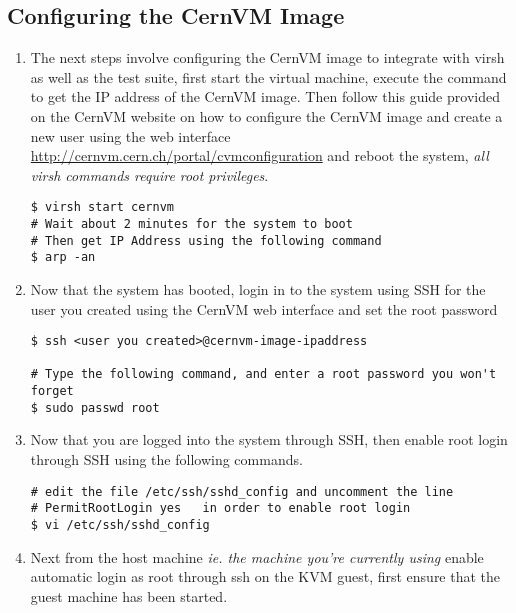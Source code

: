 \newpage
\subsection{Configuring the CernVM Image}
\label{sec:cernvmconfig}
\begin{enumerate}
\item 	The next steps involve configuring the CernVM image to integrate with virsh as well as the test suite, first
		start the virtual machine, execute the command to get the IP address of the CernVM image. Then follow this guide
		provided on the CernVM website on how to configure the CernVM image and create a new user using the web interface 
		\url{http://cernvm.cern.ch/portal/cvmconfiguration} and reboot the system, \emph{all virsh commands require root privileges}.

\begin{lstlisting}
$ virsh start cernvm
# Wait about 2 minutes for the system to boot 
# Then get IP Address using the following command
$ arp -an
\end{lstlisting}

\item 	Now that the system has booted, login in to the system using SSH for the user you created using the CernVM web interface
		and set the root password
		
\lstset{language=bash,caption=Set Root Password}
\begin{lstlisting}
$ ssh <user you created>@cernvm-image-ipaddress

# Type the following command, and enter a root password you won't forget
$ sudo passwd root
\end{lstlisting}

\item	Now that you are logged into the system through SSH, then enable root login through SSH using 
		the following commands.
				
\lstset{language=bash,caption=Enable SSH Root Login}
\begin{lstlisting}
# edit the file /etc/ssh/sshd_config and uncomment the line 
# PermitRootLogin yes	in order to enable root login
$ vi /etc/ssh/sshd_config
\end{lstlisting}

\item 	Next from the host machine \emph{ie. the machine you're currently using} enable automatic login as root 
		through ssh on the KVM guest, first ensure that the guest machine has been started.


\end{enumerate}
